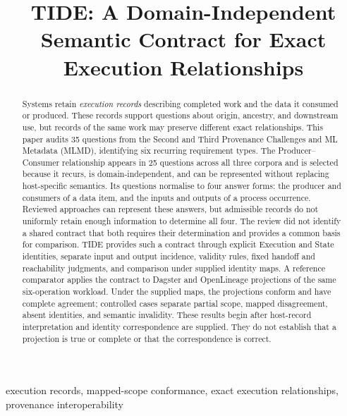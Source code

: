 \documentclass[conference]{IEEEtran}
\title{TIDE: A Domain-Independent Semantic Contract for Exact Execution Relationships}
\author{\IEEEauthorblockN{Gabriel Dolbear}
\IEEEauthorblockA{Independent Researcher\\\href{mailto:gabrieldolbear@gmail.com}{gabrieldolbear@gmail.com}}}
\theoremstyle{tideproposition}
\begin{document}
\maketitle

\setlength{\abovedisplayskip}{0.9ex plus 2pt minus 1pt}
\setlength{\belowdisplayskip}{0.9ex plus 2pt minus 1pt}
\setlength{\abovedisplayshortskip}{0pt plus 2pt}
\setlength{\belowdisplayshortskip}{0.9ex plus 2pt minus 1pt}

\begin{abstract}
Systems retain \emph{execution records} describing completed work and the data it consumed or produced. These records support questions about origin, ancestry, and downstream use, but records of the same work may preserve different exact relationships. This paper audits 35 questions from the Second and Third Provenance Challenges and ML Metadata (MLMD), identifying six recurring requirement types. The Producer--Consumer relationship appears in 25 questions across all three corpora and is selected because it recurs, is domain-independent, and can be represented without replacing host-specific semantics. Its questions normalise to four answer forms: the producer and consumers of a data item, and the inputs and outputs of a process occurrence. Reviewed approaches can represent these answers, but admissible records do not uniformly retain enough information to determine all four. The review did not identify a shared contract that both requires their determination and provides a common basis for comparison. TIDE provides such a contract through explicit Execution and State identities, separate input and output incidence, validity rules, fixed handoff and reachability judgments, and comparison under supplied identity maps. A reference comparator applies the contract to Dagster and OpenLineage projections of the same six-operation workload. Under the supplied maps, the projections conform and have complete agreement; controlled cases separate partial scope, mapped disagreement, absent identities, and semantic invalidity. These results begin after host-record interpretation and identity correspondence are supplied. They do not establish that a projection is true or complete or that the correspondence is correct.
\end{abstract}

\begin{IEEEkeywords}
execution records, mapped-scope conformance, exact execution relationships, provenance interoperability
\end{IEEEkeywords}
\end{document}
